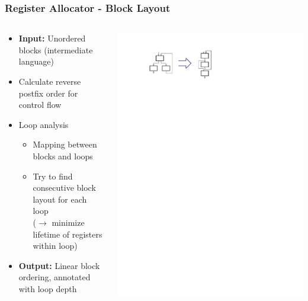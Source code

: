 \documentclass[navbaroff,en]{sdqbeamer}
\begin{document}
\begin{frame}
\frametitle{Register Allocator - Block Layout}

	\begin{columns}
		\begin{column}{0.65\textwidth}
			\begin{itemize}
				\item \textbf{Input:} Unordered blocks (intermediate language)
				\item Calculate reverse postfix order for control flow
				\item Loop analysis
					\begin{itemize}
						\item Mapping between blocks and loops
						\item Try to find consecutive block layout for each loop\\ ($\rightarrow$ minimize lifetime of registers within loop)
					\end{itemize}
				\item \textbf{Output:} Linear block ordering, annotated with loop depth
			\end{itemize}
		\end{column}
	
		 \begin{column}{0.35\textwidth}
		 	\centering \includegraphics[scale=0.7]{images/block_layout.pdf}
		 \end{column}
	\end{columns}
\end{frame}
\end{document}
